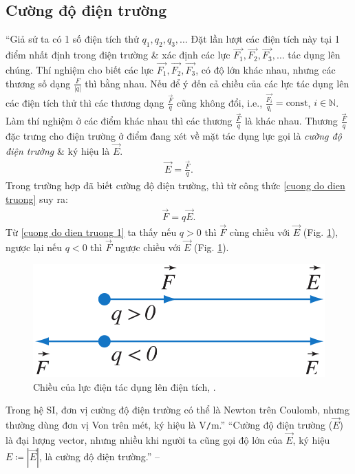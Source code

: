\documentclass[oneside]{book}
\numberwithin{equation}{section}
\begin{document}
\subsection{Cường độ điện trường}
``Giả sử ta có 1 số điện tích thử $q_1,q_2,q_3,\ldots$ Đặt lần lượt các điện tích này tại 1 điểm nhất định trong điện trường \& xác định các lực $\overrightarrow{F_1},\overrightarrow{F_2},\overrightarrow{F_3},\ldots$ tác dụng lên chúng. Thí nghiệm cho biết các lực $\overrightarrow{F_1},\overrightarrow{F_2},\overrightarrow{F_3}$, có độ lớn khác nhau, nhưng các thương số dạng $\frac{F}{|q|}$ thì bằng nhau. Nếu để ý đến cả chiều của các lực tác dụng lên các điện tích thử thì các thương dạng $\frac{\overrightarrow{F}}{q}$ cũng không đổi, i.e., $\frac{\overrightarrow{F_i}}{q_i} = \mbox{const}$, $i\in\mathbb{N}$. Làm thí nghiệm ở các điểm khác nhau thì các thương $\frac{\overrightarrow{F}}{q}$ là khác nhau. Thương $\frac{\overrightarrow{F}}{q}$ đặc trưng cho điện trường ở điểm đang xét về mặt tác dụng lực gọi là \textit{cường độ điện trường} \& ký hiệu là $\overrightarrow{E}$.
\begin{align}
	\label{cuong do dien truong}
	\boxed{\overrightarrow{E} = \frac{\overrightarrow{F}}{q}.}
\end{align}
Trong trường hợp đã biết cường độ điện trường, thì từ công thức \eqref{cuong do dien truong} suy ra:
\begin{align}
	\label{cuong do dien truong 1}
	\overrightarrow{F} = q\overrightarrow{E}.
\end{align}
Từ \eqref{cuong do dien truong 1} ta thấy nếu $q > 0$ thì $\overrightarrow{F}$ cùng chiều với $\overrightarrow{E}$ (Fig. \ref{fig:chieu luc dien}), ngược lại nếu $q < 0$ thì $\overrightarrow{F}$ ngược chiều với $\overrightarrow{E}$ (Fig. \ref{fig:chieu luc dien}).

\begin{figure}[H]
	\centering
	\includegraphics[scale=0.15]{chieu_luc_dien}
	\caption{Chiều của lực điện tác dụng lên điện tích, \cite[Hình 3.1, p. 14]{SGK_Vat_Ly_11_nang_cao}.}
	\label{fig:chieu luc dien}
\end{figure}
Trong hệ SI, đơn vị cường độ điện trường có thể là Newton trên Coulomb, nhưng thường dùng đơn vị Von trên mét, ký hiệu là V\texttt{/}m.'' ``Cường độ điện trường ($\overrightarrow{E}$) là đại lượng vector, nhưng nhiều khi người ta cũng gọi độ lớn của $\overrightarrow{E}$, ký hiệu $E\coloneqq| \overrightarrow{E}|$, là cường độ điện trường.'' -- \cite[p. 14]{SGK_Vat_Ly_11_nang_cao}
\end{document}

